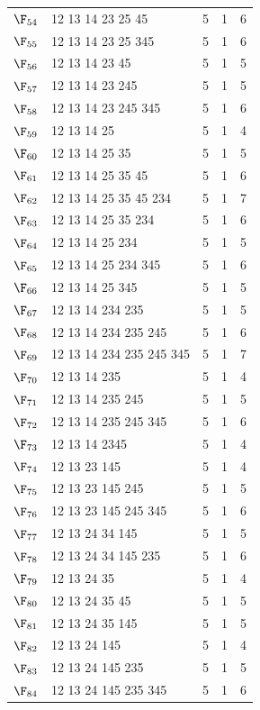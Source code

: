 {\begin{longtable}{c p{7cm} c c c}
$\F_{54}$ & 12 13 14 23 25 45 & 5 & 1 & 6 \\
$\F_{55}$ & 12 13 14 23 25 345 & 5 & 1 & 6 \\
$\F_{56}$ & 12 13 14 23 45 & 5 & 1 & 5 \\
$\F_{57}$ & 12 13 14 23 245 & 5 & 1 & 5 \\
$\F_{58}$ & 12 13 14 23 245 345 & 5 & 1 & 6 \\
$\F_{59}$ & 12 13 14 25 & 5 & 1 & 4 \\
$\F_{60}$ & 12 13 14 25 35 & 5 & 1 & 5 \\
$\F_{61}$ & 12 13 14 25 35 45 & 5 & 1 & 6 \\
$\F_{62}$ & 12 13 14 25 35 45 234 & 5 & 1 & 7 \\
$\F_{63}$ & 12 13 14 25 35 234 & 5 & 1 & 6 \\
$\F_{64}$ & 12 13 14 25 234 & 5 & 1 & 5 \\
$\F_{65}$ & 12 13 14 25 234 345 & 5 & 1 & 6 \\
$\F_{66}$ & 12 13 14 25 345 & 5 & 1 & 5 \\
$\F_{67}$ & 12 13 14 234 235 & 5 & 1 & 5 \\
$\F_{68}$ & 12 13 14 234 235 245 & 5 & 1 & 6 \\
$\F_{69}$ & 12 13 14 234 235 245 345 & 5 & 1 & 7 \\
$\F_{70}$ & 12 13 14 235 & 5 & 1 & 4 \\
$\F_{71}$ & 12 13 14 235 245 & 5 & 1 & 5 \\
$\F_{72}$ & 12 13 14 235 245 345 & 5 & 1 & 6 \\
$\F_{73}$ & 12 13 14 2345 & 5 & 1 & 4 \\
$\F_{74}$ & 12 13 23 145 & 5 & 1 & 4 \\
$\F_{75}$ & 12 13 23 145 245 & 5 & 1 & 5 \\
$\F_{76}$ & 12 13 23 145 245 345 & 5 & 1 & 6 \\
$\F_{77}$ & 12 13 24 34 145 & 5 & 1 & 5 \\
$\F_{78}$ & 12 13 24 34 145 235 & 5 & 1 & 6 \\
$\F_{79}$ & 12 13 24 35 & 5 & 1 & 4 \\
$\F_{80}$ & 12 13 24 35 45 & 5 & 1 & 5 \\
$\F_{81}$ & 12 13 24 35 145 & 5 & 1 & 5 \\
$\F_{82}$ & 12 13 24 145 & 5 & 1 & 4 \\
$\F_{83}$ & 12 13 24 145 235 & 5 & 1 & 5 \\
$\F_{84}$ & 12 13 24 145 235 345 & 5 & 1 & 6 \\

\end{longtable}}
